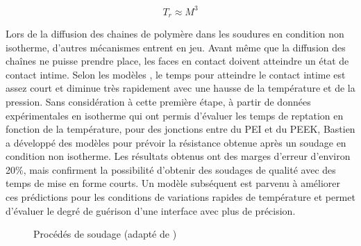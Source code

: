 \begin{equation}
T_r \approx M^3
\end{equation}

Lors de la diffusion des chaines de polymère dans les soudures en condition non isotherme, d'autres mécanismes entrent en jeu. 
Avant même que la diffusion des chaînes ne puisse prendre place, les faces en contact doivent atteindre un état de contact intime. 
Selon les modèles \cite{Yang2002}, le temps pour atteindre le contact intime est assez court et diminue très rapidement avec une hausse de la température et de la pression. 
Sans considération à cette première étape, à partir de données expérimentales en isotherme qui ont permis d'évaluer les temps de reptation en fonction de la température, pour des jonctions entre du PEI et du PEEK, Bastien \cite{Bastien1991} a développé des modèles pour prévoir la résistance obtenue après un soudage en condition non isotherme. 
Les résultats obtenus ont des marges d'erreur d'environ 20\%, mais confirment la possibilité d'obtenir des soudages de qualité avec des temps de mise en forme courts. 
Un modèle subséquent \cite{F.Yang2002} est parvenu à améliorer ces prédictions pour les conditions de variations rapides de température et permet d'évaluer le degré de guérison d'une interface avec plus de précision. 

\begin{figure}[]
	\centering
	
	\caption{Procédés de soudage (adapté de \cite{Ageorges2001a})}
	\label{fig:arbre_procédé_soudage}
\end{figure}

